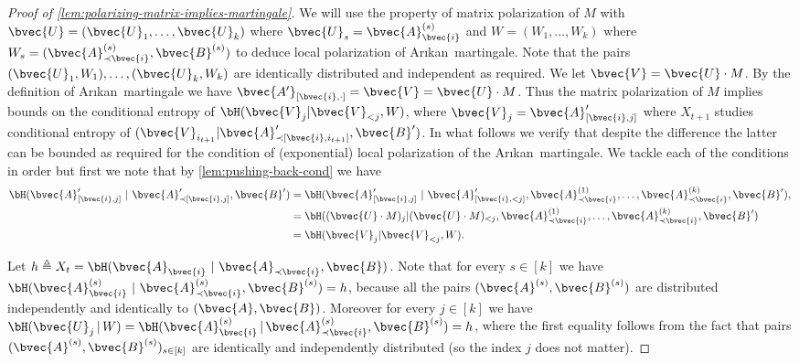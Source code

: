 \documentclass[11pt]{article}
\newcommand{\Arikan}{Ar\i kan}
\begin{document}
\begin{proof}[Proof of \cref{lem:polarizing-matrix-implies-martingale}]
	We will use the property of matrix polarization of $M$ with $\bvec{U} = (\bvec{U}_1,\ldots,\bvec{U}_k)$ where $\bvec{U}_s =  \bvec{A}^{(s)}_\bvec{i}$ and $W = (W_1,\ldots,W_k)$ where $W_s = (\bvec{A}^{(s)}_{\prec \bvec{i}}, \bvec{B}^{(s)})$ to deduce local polarization of \Arikan~martingale. 
	Note that the pairs $(\bvec{U}_1,W_1),\ldots,(\bvec{U}_k,W_k)$ are identically distributed and independent as required. 
	We let $\bvec{V} = \bvec{U}\cdot M$.  By the definition of \Arikan~martingale we have $\bvec{A'}_{[\bvec{i}, \cdot]} = \bvec{V} = \bvec{U} \cdot M$.
	Thus the matrix polarization of $M$ implies bounds on the conditional entropy of $\bH(\bvec{V}_j|\bvec{V}_{<j},W)$, where $\bvec{V}_j = \bvec{A}'_{[\bvec{i},j]}$ where $X_{t+1}$ studies conditional entropy of $(\bvec{V}_{i_{t+1}} | \bvec{A}'_{\prec[\bvec{i},i_{t+1}]},\bvec{B}')$. In what follows we verify that despite the difference the latter can be bounded as required for the condition of (exponential) local polarization of the \Arikan\ martingale. We tackle each of the conditions in order
	but first we note that by \cref{lem:pushing-back-cond} we have
	\begin{align}
		\bH(\bvec{A}'_{[\bvec{i}, j]} ~|~ \bvec{A}'_{\prec [\bvec{i}, j]}, \bvec{B}') &  = 
		\bH(\bvec{A}'_{[\bvec{i}, j]}  ~|~ \bvec{A}'_{[\bvec{i}, <j]}, \bvec{A}^{(1)}_{\prec \bvec{i}}, \ldots, \bvec{A}^{(k)}_{\prec \bvec{i}}, \bvec{B}'), \nonumber \\
		& = \bH( (\bvec{U} \cdot M)_{j} | (\bvec{U} \cdot M)_{<j}, \bvec{A}^{(1)}_{\prec \bvec{i}}, \ldots, \bvec{A}^{(k)}_{\prec \bvec{i}}, \bvec{B}' ) \nonumber \\
		& = \bH( \bvec{V}_{j} | \bvec{V}_{<j}, W ).
		\label{eq:entrop-eq}
	\end{align}
	
	Let $h \triangleq X_t = \bH(\bvec{A}_{\bvec{i}} ~|~ \bvec{A}_{\prec \bvec{i}}, \bvec{B})$. Note that for every $s \in [k]$ we have $\bH(\bvec{A}^{(s)}_{\bvec{i}} ~|~ \bvec{A}^{(s)}_{\prec \bvec{i}}, \bvec{B}^{(s)}) = h$, because all the pairs $(\bvec{A}^{(s)}, \bvec{B}^{(s)})$ are distributed independently and identically to $(\bvec{A},\bvec{B})$. Moreover for every $j\in[k]$ we have $\bH(\bvec{U}_j \, | \, W) = \bH(\bvec{A}_{\bvec{i}}^{(s)} \, | \, \bvec{A}^{(s)}_{\prec \bvec{i}}, \bvec{B}^{(s)}) = h$, where the first equality follows from the fact that pairs $(\bvec{A}^{(s)}, \bvec{B}^{(s)})_{s \in [k]}$ are identically and independently distributed (so the index $j$ does not matter).
	
	
	

\end{proof}
\end{document}
